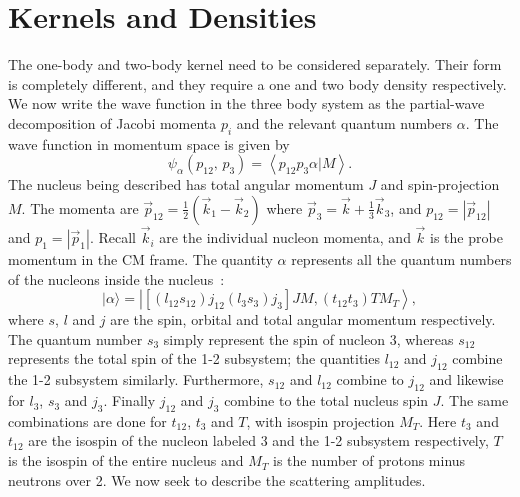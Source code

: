 \documentclass[a4paper,11pt]{article}
\newcommand{\bkt}[2]{\left \langle #1 |#2 \right \rangle}
\newcommand\bv[1]{\vec{#1}}
\begin{document}
\section{Kernels and Densities}
The one-body and two-body kernel need to be considered separately.
Their form is completely different, and they require a one and two
body density respectively.
We now write the wave function in the three body system as the
partial-wave decomposition of Jacobi momenta $p_i$ and the relevant
quantum numbers $\alpha$. The wave function in momentum space is given by
\begin{equation}
  \psi_\alpha (p_{12},\, p_3 ) = \bkt{p_{12} p_3 \alpha}{M}.
\end{equation}
The nucleus being described has total angular momentum $J$ and
spin-projection $M$. The momenta are $\bv{p}_{12}= \frac{1}{2}
\left(\bv{k}_1 - \bv{k}_2\right)$ where $ \bv{p}_3 = \bv{k}+
\frac{1}{3} \bv{k}_3 $, and $p_{12} = |\bv{p}_{12}|$ and  $p_{1} =
|\bv{p}_{1}|.$ Recall $\bv{k}_i$ are the individual nucleon momenta,
and $\bv{k}$ is the probe momentum in the CM frame. The quantity
$\alpha$ represents all the quantum numbers of the nucleons inside
the nucleus~\cite{hammer2020}:
\begin{equation}
  |\alpha\rangle=\left|\left[\left(l_{12} s_{12}\right)
  j_{12}\left(l_{3} s_{3}\right) j_{3}\right] J M,\left(t_{12}
  t_{3}\right) T M_{T}\right\rangle,
\end{equation}
where $s$, $l$ and $j$ are the spin, orbital and total angular
momentum respectively. The quantum number $s_3$ simply represent the
spin of nucleon 3, whereas $s_{12}$ represents the total spin of the
1-2 subsystem; the quantities $l_{12}$ and $j_{12}$ combine the 1-2
subsystem similarly. Furthermore, $s_{12}$ and $l_{12}$ combine to
$j_{12}$ and likewise for $l_3$, $s_3$ and $j_3$. Finally $j_{12}$
and $j_3$ combine to the total nucleus spin $J$.
The same combinations are done for $t_{12}$, $t_3$ and $T$, with
isospin projection $M_T$. Here $t_3$ and $t_{12}$ are the isospin of
the nucleon labeled 3 and the 1-2 subsystem respectively, $T$ is the
isospin of the entire nucleus and $M_T$ is the number of protons
minus neutrons over 2.
We now seek to describe the scattering amplitudes.
\end{document}

